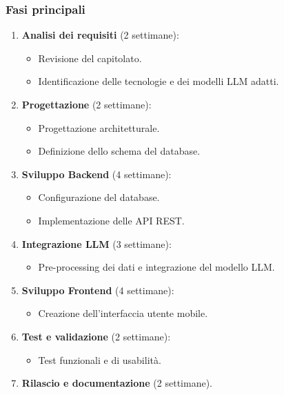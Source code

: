 \documentclass{article}
\begin{document}
                \subsubsection{Fasi principali}  %
                \begin{enumerate}
                    \item \textbf{Analisi dei requisiti} (2 settimane):
                    \begin{itemize}
                        \item Revisione del capitolato.
                        \item Identificazione delle tecnologie e dei modelli LLM adatti.
                    \end{itemize}
                    \item \textbf{Progettazione} (2 settimane):
                    \begin{itemize}
                        \item Progettazione architetturale.
                        \item Definizione dello schema del database.
                    \end{itemize}
                    \item \textbf{Sviluppo Backend} (4 settimane):
                    \begin{itemize}
                        \item Configurazione del database.
                        \item Implementazione delle API REST.
                    \end{itemize}
                    \item \textbf{Integrazione LLM} (3 settimane):
                    \begin{itemize}
                        \item Pre-processing dei dati e integrazione del modello LLM.
                    \end{itemize}
                    \item \textbf{Sviluppo Frontend} (4 settimane):
                    \begin{itemize}
                        \item Creazione dell'interfaccia utente mobile.
                    \end{itemize}
                    \item \textbf{Test e validazione} (2 settimane):
                    \begin{itemize}
                        \item Test funzionali e di usabilità.
                    \end{itemize}
                    \item \textbf{Rilascio e documentazione} (2 settimane).
                \end{enumerate}
        
\end{document}
